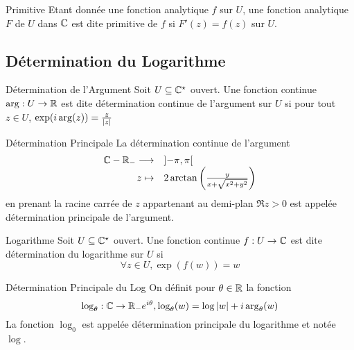 \documentclass{cours}
\begin{document}
\begin{définition}{Primitive}{}
    Etant donnée une fonction analytique $f$ sur $U$, une fonction analytique $F$ de $U$ dans $\mathbb{C}$ est dite primitive de $f$ si $F'(z) = f(z)$ sur $U$. 
\end{définition}

\subsection{Détermination du Logarithme}
\begin{définition}{Détermination de l'Argument}{}
    Soit $U \subseteq \mathbb{C}^{\star}$ ouvert. Une fonction continue $\arg : U \to \mathbb{R}$ est dite détermination continue de l'argument sur $U$ si pour tout $z \in U$, $\exp(i\arg(z))=\frac{z}{\left|z\right|}$
\end{définition}
\begin{définition}{Détermination Principale}{}
    La détermination continue de l'argument 
    \[
        \begin{array}{rl}
            \mathbb{C} - \mathbb{R}_{-} \longrightarrow & \left] - \pi, \pi \right[\\
            z \mapsto & 2\arctan\left(\frac{y}{x + \sqrt{x^{2} + y^{2}}}\right)
        \end{array}
    \]
    en prenant la racine carrée de $z$ appartenant au demi-plan $\Re z > 0$ est appelée détermination principale de l'argument.
\end{définition}
\begin{définition}{Logarithme}{}
    Soit $U \subseteq \mathbb{C}^{\star}$ ouvert. Une fonction continue $f : U \to \mathbb{C}$ est dite détermination du logarithme sur $U$ si 
    \[
        \forall z \in U, \exp(f(w)) = w
    \]
\end{définition}

\begin{définition}{Détermination Principale du Log}{}
    On définit pour $\theta \in \mathbb{R}$ la fonction
    \[
        \log_{\theta} : \mathbb{C} \to \mathbb{R}_{-}e^{i\theta}, \log_{\theta}(w)=\log \left|w\right| + i\arg_{\theta}(w)
    \]
    La fonction $\log_{0}$ est appelée détermination principale du logarithme et notée $\log$. 
\end{définition}
\end{document}
